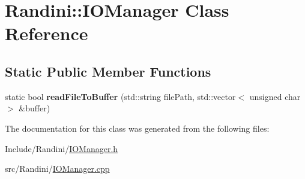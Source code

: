 \hypertarget{classRandini_1_1IOManager}{
\section{Randini::IOManager Class Reference}
\label{classRandini_1_1IOManager}
}
\subsection*{Static Public Member Functions}
\begin{DoxyCompactItemize}
\item 
\hypertarget{classRandini_1_1IOManager_a2fee0167fb6b1731495af896f6441e3e}{
static bool {\bfseries readFileToBuffer} (std::string filePath, std::vector$<$ unsigned char $>$ \&buffer)}
\label{classRandini_1_1IOManager_a2fee0167fb6b1731495af896f6441e3e}

\end{DoxyCompactItemize}


The documentation for this class was generated from the following files:\begin{DoxyCompactItemize}
\item 
Include/Randini/\hyperlink{IOManager_8h}{IOManager.h}\item 
src/Randini/\hyperlink{IOManager_8cpp}{IOManager.cpp}\end{DoxyCompactItemize}
